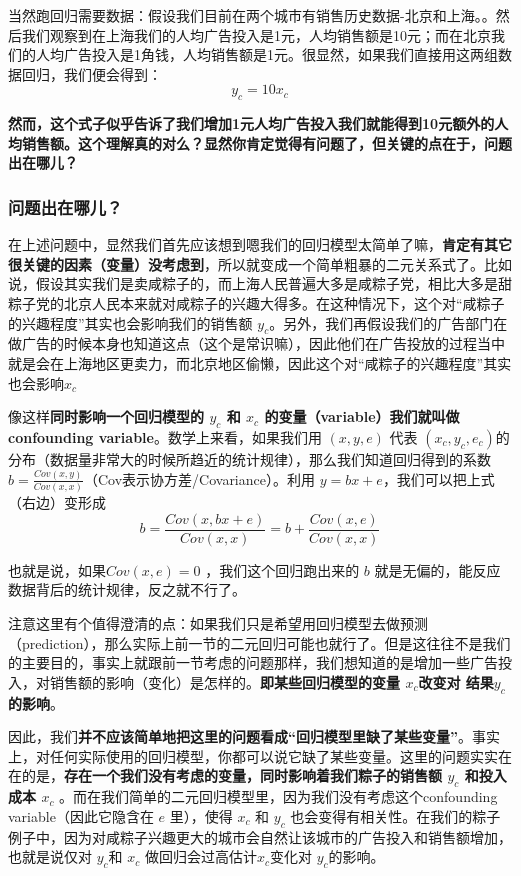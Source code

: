 \documentclass[12pt]{article}
\begin{document}
当然跑回归需要数据：假设我们目前在两个城市有销售历史数据-北京和上海。。然后我们观察到在上海我们的人均广告投入是1元，人均销售额是10元；而在北京我们的人均广告投入是1角钱，人均销售额是1元。很显然，如果我们直接用这两组数据回归，我们便会得到：
$$
y_c = 10x_c
$$

\textbf{然而，这个式子似乎告诉了我们增加1元人均广告投入我们就能得到10元额外的人均销售额。这个理解真的对么？显然你肯定觉得有问题了，但关键的点在于，问题出在哪儿？}

\subsubsection{问题出在哪儿？}
在上述问题中，显然我们首先应该想到嗯我们的回归模型太简单了嘛，\textbf{肯定有其它很关键的因素（变量）没考虑到}，所以就变成一个简单粗暴的二元关系式了。比如说，假设其实我们是卖咸粽子的，而上海人民普遍大多是咸粽子党，相比大多是甜粽子党的北京人民本来就对咸粽子的兴趣大得多。在这种情况下，这个对“咸粽子的兴趣程度”其实也会影响我们的销售额 $y_c$。另外，我们再假设我们的广告部门在做广告的时候本身也知道这点（这个是常识嘛），因此他们在广告投放的过程当中就是会在上海地区更卖力，而北京地区偷懒，因此这个对“咸粽子的兴趣程度”其实也会影响$x_c$

像这样\textbf{同时影响一个回归模型的 $y_c$ 和 $x_c$ 的变量（variable）我们就叫做confounding variable}。数学上来看，如果我们用 $(x,y,e)$ 代表 $(x_c,y_c,e_c)$的分布（数据量非常大的时候所趋近的统计规律），那么我们知道回归得到的系数 $b = \frac{Cov(x,y)}{Cov(x,x)}$（Cov表示协方差/Covariance）。利用 $y = bx + e$，我们可以把上式（右边）变形成
$$
b = \frac{Cov(x,bx + e)}{Cov(x,x) }= b + \frac{Cov(x,e)}{Cov(x,x)}
$$

也就是说，如果$Cov(x,e) = 0$ ，我们这个回归跑出来的 $b$ 就是无偏的，能反应数据背后的统计规律，反之就不行了。

注意这里有个值得澄清的点：如果我们只是希望用回归模型去做预测（prediction），那么实际上前一节的二元回归可能也就行了。但是这往往不是我们的主要目的，事实上就跟前一节考虑的问题那样，我们想知道的是增加一些广告投入，对销售额的影响（变化）是怎样的。\textbf{即某些回归模型的变量 $x_c$改变对 结果$y_c$的影响}。

因此，我们\textbf{并不应该简单地把这里的问题看成“回归模型里缺了某些变量”}。事实上，对任何实际使用的回归模型，你都可以说它缺了某些变量。这里的问题实实在在的是，\textbf{存在一个我们没有考虑的变量，同时影响着我们粽子的销售额 $y_c$ 和投入成本  $x_c$ }。而在我们简单的二元回归模型里，因为我们没有考虑这个confounding variable（因此它隐含在 $e$ 里），使得 $x_c$ 和  $y_c$ 也会变得有相关性。在我们的粽子例子中，因为对咸粽子兴趣更大的城市会自然让该城市的广告投入和销售额增加，也就是说仅对 $y_c$和 $x_c$ 做回归会过高估计$x_c$变化对 $y_c$的影响。
\end{document}
